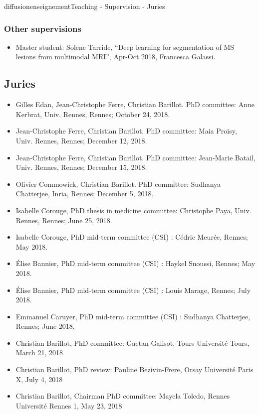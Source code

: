 \documentclass{ra2018}
\begin{document}
\begin{module}{diffusion}{enseignement}{Teaching - Supervision - Juries}
  \subsubsection{Other supervisions}
  \begin{itemize}
           \item Master student: Solene Tarride, ``Deep learning for segmentation of MS lesions from multimodal MRI'', Apr-Oct 2018, Francesca Galassi.
  \end{itemize}

\subsection {Juries}
\begin{itemize}
    \item Gilles Edan, Jean-Christophe Ferre, Christian Barillot. PhD committee: Anne Kerbrat, Univ. Rennes, Rennes; October 24, 2018.
    \item Jean-Christophe Ferre, Christian Barillot. PhD committee: Maia Proisy, Univ. Rennes, Rennes; December 12, 2018.
    \item Jean-Christophe Ferre, Christian Barillot. PhD committee: Jean-Marie Batail, Univ. Rennes, Rennes; December 15, 2018.
    \item Olivier Commowick, Christian Barillot. PhD committee: Sudhanya Chatterjee, Inria, Rennes; December 5, 2018.
    \item Isabelle Corouge, PhD thesis in medicine committee: Christophe Paya, Univ. Rennes, Rennes; June 25, 2018.
    \item Isabelle Corouge, PhD mid-term committee (CSI) : Cédric Meurée, Rennes; May 2018.
    \item Élise Bannier, PhD mid-term committee (CSI) : Haykel Snoussi, Rennes; May 2018.
    \item Élise Bannier, PhD mid-term committee (CSI) : Louis Marage, Rennes; July 2018.
    \item Emmanuel Caruyer, PhD mid-term committee (CSI) : Sudhanya Chatterjee, Rennes; June 2018.
    \item Christian Barillot, PhD committee: Gaetan Galisot, Tours  Université Tours,  March 21, 2018
    \item Christian Barillot, PhD review: Pauline Bezivin-Frere, Orsay  Université Paris X,  July 4, 2018
    \item Christian Barillot, Chairman PhD committee: Mayela Toledo, Rennes  Université Rennes 1,  May 23, 2018
\end{itemize}


\end{module}
\end{document}
